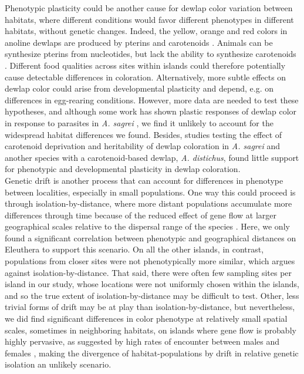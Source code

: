 Phenotypic plasticity could be another cause for dewlap color variation between habitats, where different conditions would favor different phenotypes in different habitats, without genetic changes. Indeed, the yellow, orange and red colors in anoline dewlaps are produced by pterins and carotenoids \citep{Ortiz1962, Ortiz1962a, Ortiz1963, Ortiz1966, Macedonia2000, Steffen2007, Steffen2009}. Animals can be synthesize pterins from nucleotides, but lack the ability to synthesize carotenoids \citep{Goodwin1984, Hill2002, Hill2006}. Different food qualities across sites within islands could therefore potentially cause detectable differences in coloration. Alternatively, more subtle effects on dewlap color could arise from developmental plasticity and depend, e.g. on differences in egg-rearing conditions. However, more data are needed to test these hypotheses, and although some work has shown plastic responses of dewlap color in response to parasites in \textit{A. sagrei} \citep{Cook2013}, we find it unlikely to account for the widespread habitat differences we found. Besides, studies testing the effect of carotenoid deprivation \citep{Steffen2010, Ng2013} and heritability \citep{Cox2017} of dewlap coloration in \textit{A. sagrei} and another species with a carotenoid-based dewlap, \textit{A. distichus}, found little support for phenotypic and developmental plasticity in dewlap coloration.\\

Genetic drift is another process that can account for differences in phenotype between localities, especially in small populations. One way this could proceed is through isolation-by-distance, where more distant populations accumulate more differences through time because of the reduced effect of gene flow at larger geographical scales relative to the dispersal range of the species \citep{Rousset2004}. Here, we only found a significant correlation between phenotypic and geographical distances on Eleuthera to support this scenario. On all the other islands, in contrast, populations from closer sites were not phenotypically more similar, which argues against isolation-by-distance. That said, there were often few sampling sites per island in our study, whose locations were not uniformly chosen within the islands, and so the true extent of isolation-by-distance may be difficult to test. Other, less trivial forms of drift may be at play than isolation-by-distance, but nevertheless, we did find significant differences in color phenotype at relatively small spatial scales, sometimes in neighboring habitats, on islands where gene flow is probably highly pervasive, as suggested by high rates of encounter between males and females \citep{Kamath2018}, making the divergence of habitat-populations by drift in relative genetic isolation an unlikely scenario.\\

